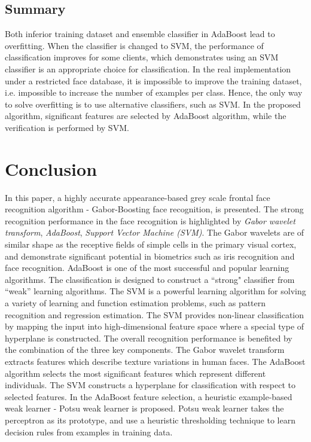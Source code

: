 \documentclass[a4paper,10pt]{article}
\begin{document}
\subsection{Summary}
Both inferior training dataset and ensemble classifier in AdaBoost lead to overfitting. When the classifier is changed to SVM, the performance of classification improves for some clients, which demonstrates using an SVM classifier is an appropriate choice for classification. In the real implementation under a restricted face database, it is impossible to improve the training dataset, i.e. impossible to increase the number of examples per class. Hence, the only way to solve overfitting is to use alternative classifiers, such as SVM. In the proposed algorithm, significant features are selected by AdaBoost algorithm, while the verification is performed by SVM.

\section{Conclusion}
\label{conclusion}
In this paper, a highly accurate appearance-based grey scale frontal face recognition algorithm - Gabor-Boosting face recognition, is presented. The strong recognition performance in the face recognition is highlighted by \textit{Gabor wavelet transform}, \textit{AdaBoost}, \textit{Support Vector Machine (SVM)}. The Gabor wavelets are of similar shape as the receptive fields of simple cells in the primary visual cortex, and demonstrate significant potential in biometrics such as iris recognition and face recognition. AdaBoost is one of the most successful and popular learning algorithms. The classification is designed to construct a ``strong" classifier from ``weak'' learning algorithms. The SVM is a powerful learning algorithm for solving a variety of learning and function estimation problems, such as pattern recognition and regression estimation. The SVM provides non-linear classification by mapping the input into high-dimensional feature space where a special type of hyperplane is constructed. The overall recognition performance is benefited by the combination of the three key components. The Gabor wavelet transform extracts features which describe texture variations in human faces. The AdaBoost algorithm selects the most significant features which represent different individuals. The SVM constructs a hyperplane for classification with respect to selected features. In the AdaBoost feature selection, a heuristic example-based weak learner - Potsu weak learner is proposed. Potsu weak learner takes the perceptron as its prototype, and use a heuristic thresholding technique to learn decision rules from examples in training data. 
\end{document}

